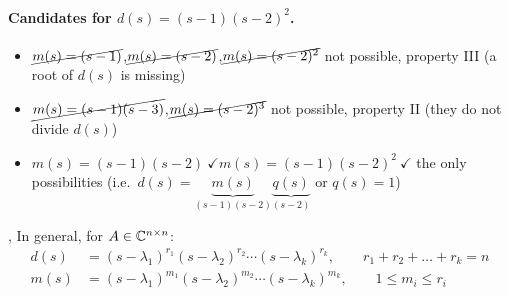 \paragraph{Candidates for $d(s)=(s-1)(s-2)^2$.}
\begin{itemize}[itemsep=2pt]
\item $\cancel{m(s)=(s-1)}$,\quad $\cancel{m(s)=(s-2)}$,\quad $\cancel{m(s)=(s-2)^2}$\newline {\small$\triangleright$} not possible, property III (a root of $d(s)$ is missing)
\item $\cancel{m(s)=(s-1)(s-3)}$,\quad $\cancel{m(s)=(s-2)^3}$\newline {\small$\triangleright$} not possible, property II (they do not divide $d(s)$)
\item $m(s)=(s-1)(s-2)\ \checkmark$\qquad $m(s)=(s-1)(s-2)^2\ \checkmark$\newline {\small$\triangleright$} the only possibilities (i.e.\ $d(s)=\underbrace{m(s)}_{(s-1)(s-2)}\underbrace{q(s)}_{(s-2)}$ or $q(s)=1$)
\end{itemize}

\sep
In general, for $A\in\mathbb{C}^{n\times n}$:
\begin{align*}
d(s)&=(s-\lambda_1)^{r_1}(s-\lambda_2)^{r_2}\cdots(s-\lambda_k)^{r_k}, \qquad r_1+r_2+\dots+r_k=n\\
m(s)&=(s-\lambda_1)^{m_1}(s-\lambda_2)^{m_2}\cdots(s-\lambda_k)^{m_k}, \qquad \boxed{1\le m_i\le r_i}
\end{align*}

